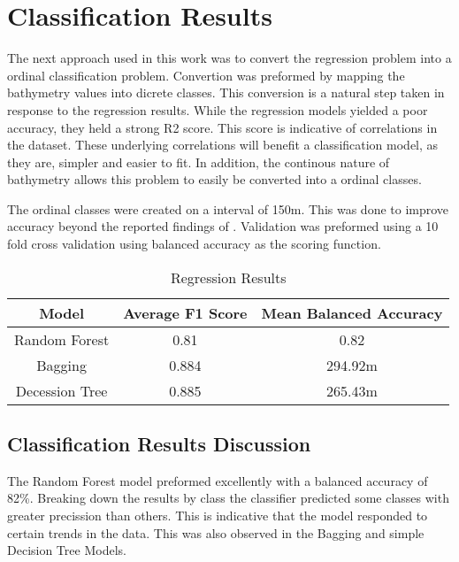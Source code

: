 \section{Classification Results}
\setlength{\parindent}{10ex}
The next approach used in this work was to convert the regression problem into a ordinal classification problem.
Convertion was preformed by mapping the bathymetry values into dicrete classes.
This conversion is a natural step taken in response to the regression results.
While the regression models yielded a poor accuracy, they held a strong R2 score.
This score is indicative of correlations in the dataset.
These underlying correlations will benefit a classification model, as they are, simpler and easier to fit.
In addition, the continous nature of bathymetry allows this problem to easily be converted into a ordinal classes.

\par
The ordinal classes were created on a interval of 150m.
This was done to improve accuracy beyond the reported findings of \cite{jena2012prediction}.
Validation was preformed using a 10 fold cross validation using balanced accuracy as the scoring function.

\begin{center}
    \begin{table}[htb]
        \begin{tabular}{|c c c|}
            \hline
			\textbf{Model} & \textbf{Average F1 Score} & \textbf{Mean Balanced Accuracy} \\
			\hline
			Random Forest & 0.81 & 0.82 \\
            Bagging & 0.884 & 294.92m \\
            Decession Tree & 0.885 & 265.43m \\
			\hline
        \end{tabular}
        \label{table:CLASSIFICATION_RESULTS}
        \caption{Regression Results}
    \end{table}
\end{center}

\subsection{Classification Results Discussion}
The Random Forest model preformed excellently with a balanced accuracy of 82\%.
Breaking down the results by class the classifier predicted some classes with greater precission than others.
This is indicative that the model responded to certain trends in the data.
This was also observed in the Bagging and simple Decision Tree Models.